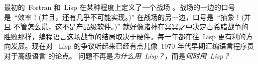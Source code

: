 最初的~Fortran 和~Lisp 在某种程度上定义了一个战场
。战场的一边的口号
是~``效率！(并且，还有几乎不可能实现。)'' 在战场的另一边，口号是~``抽象！(并且
不管怎么说，这不是产品级软件。)'' 就好像诸神在冥冥之中决定古希腊战争的
胜败那样，编程语言这场战争的结局取决于硬件。每一年都在往~Lisp 更有利的方向发展。现在对
~Lisp 的争议听起来已经有点儿像~1970 年代早期汇编语言程序员对于高级语言
的论点。
问题不再是\emph{为什么用~Lisp？}，而是\emph{何时用~Lisp？}

